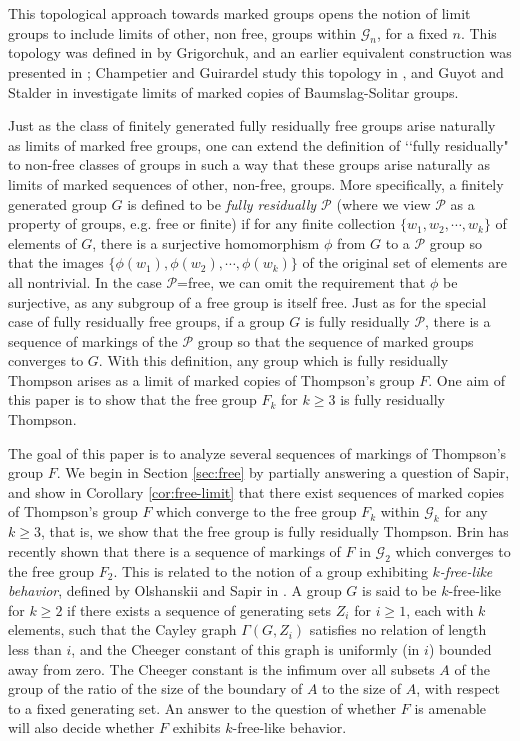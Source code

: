 \documentclass[11pt]{amsart}
\begin{document}
This topological approach towards marked groups opens the
notion of limit groups to include limits of other, non free,
groups within ${\mathcal G}_n$, for a fixed $n$.  This topology
was defined in \cite{G} by Grigorchuk, and an earlier equivalent
construction was presented in \cite{C}; Champetier and Guirardel
study this topology in \cite{CG}, and Guyot and Stalder in
\cite{St,GS} investigate limits of marked copies of
Baumslag-Solitar groups.

Just as the class of finitely generated fully residually free
groups arise naturally as limits of marked free groups, one can
extend the definition of \lq \lq fully residually" to non-free
classes of groups in such a way that these groups arise naturally
as limits of marked sequences of other, non-free, groups. More
specifically, a finitely generated group $G$ is defined to be {\em
fully residually ${\mathcal P}$} (where we view ${\mathcal P}$ as
a property of groups, e.g. free or finite) if for any finite
collection $\{w_1,w_2, \cdots ,w_k\}$ of elements of $G$, there is
a surjective homomorphism $\phi$ from $G$ to a ${\mathcal P}$
group so that the images $\{\phi(w_1),\phi(w_2), \cdots
,\phi(w_k)\}$ of the original set of elements are all nontrivial.
In the case ${\mathcal P}$=free, we can omit the requirement that
$\phi$ be surjective, as any subgroup of a free group is itself
free.  Just as for the special case of fully residually free
groups, if a group $G$ is fully residually ${\mathcal P}$, there is a
sequence of markings of the ${\mathcal P}$ group so that the
sequence of marked groups converges to $G$. With this definition,
any group which is fully residually Thompson arises as a limit of
marked copies of Thompson's group $F$.  One aim of this paper is
to show that the free group $F_k$ for $k \geq 3$ is fully
residually Thompson.

The goal of this paper is to analyze several sequences of markings
of Thompson's group $F$.  We begin in Section \ref{sec:free} by partially
answering a question of Sapir, and show in Corollary
\ref{cor:free-limit} that there exist sequences of marked copies
of Thompson's group $F$ which converge to the free group $F_k$
within ${\mathcal G}_k$ for any $k \geq 3$, that is, we show that
the free group is fully residually Thompson.  Brin \cite{B} has
recently shown that there is a sequence of markings of $F$ in
${\mathcal G}_2$ which converges to the free group $F_2$.
This is related to the notion of a group exhibiting {\em $k$-free-like behavior},
defined by Olshanskii and Sapir  in \cite{OS}.   A group $G$ is said to be $k$-free-like for $k \geq 2$
if there exists a sequence of generating sets $Z_i$ for $i \geq
1$, each with $k$ elements, such that the Cayley graph
$\Gamma(G,Z_i)$ satisfies no relation of length less than $i$, and
the Cheeger constant of this graph is uniformly (in $i$) bounded
away from zero.  The Cheeger constant is the infimum over all
subsets $A$ of the group of the ratio of the size of the boundary
of $A$ to the size of $A$, with respect to a fixed generating set.
An answer to the question of whether $F$ is amenable will also decide
whether $F$ exhibits $k$-free-like behavior.
\end{document}

